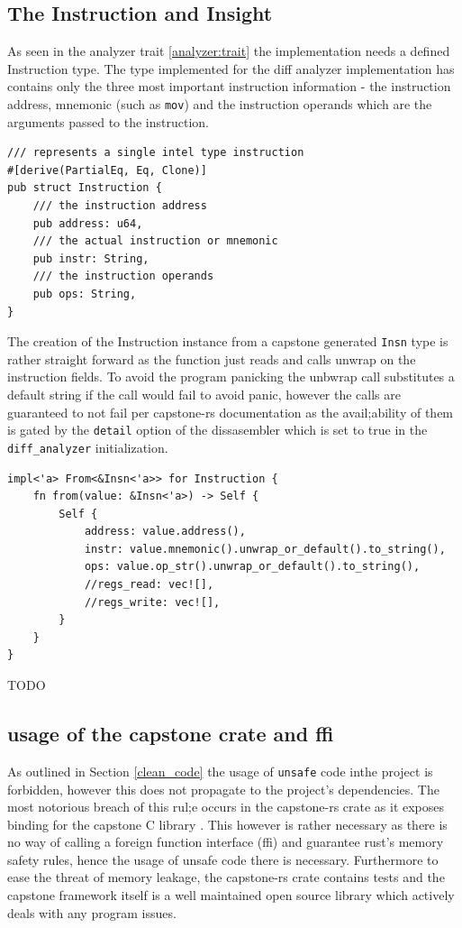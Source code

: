 \subsection{The Instruction and Insight}

As seen in the analyzer trait \ref{analyzer:trait} the implementation needs a defined Instruction type. 
The type implemented for the diff analyzer implementation has contains only the three most important instruction information - the instruction address, mnemonic (such as \verb|mov|) and the instruction operands which are the arguments passed to the instruction.

\begin{lstlisting}
/// represents a single intel type instruction
#[derive(PartialEq, Eq, Clone)]
pub struct Instruction {
    /// the instruction address
    pub address: u64,
    /// the actual instruction or mnemonic
    pub instr: String,
    /// the instruction operands
    pub ops: String,
}
\end{lstlisting}

The creation of the Instruction instance from a capstone generated \verb|Insn| type is rather straight forward as the function just reads and calls unwrap on the instruction fields. 
To avoid the program panicking the unbwrap call substitutes a default string if the call would fail to avoid panic, however the calls are guaranteed to not fail per capstone-rs documentation as the avail;ability of them is gated by the \verb|detail| option of the dissasembler which is set to true in the \verb|diff_analyzer| initialization.

\begin{lstlisting}
impl<'a> From<&Insn<'a>> for Instruction {
    fn from(value: &Insn<'a>) -> Self {
        Self {
            address: value.address(),
            instr: value.mnemonic().unwrap_or_default().to_string(),
            ops: value.op_str().unwrap_or_default().to_string(),
            //regs_read: vec![],
            //regs_write: vec![],
        }
    }
}
\end{lstlisting}

TODO

\subsection{usage of the capstone crate and ffi}

As outlined in Section \ref{clean_code} the usage of \verb|unsafe| code inthe project is forbidden, however this does not propagate to the project's dependencies.
The most notorious breach of this rul;e occurs in the capstone-rs crate as it exposes binding for the capstone C library \cite{finkenauer_capstone-rustcapstone-rs_nodate}.
This however is rather necessary as there is no way of calling a foreign function interface (ffi) and guarantee rust's memory safety rules, hence the usage of unsafe code there is necessary.
Furthermore to ease the threat of memory leakage, the capstone-rs crate contains tests and the capstone framework itself is a well maintained open source library which actively deals with any program issues.

